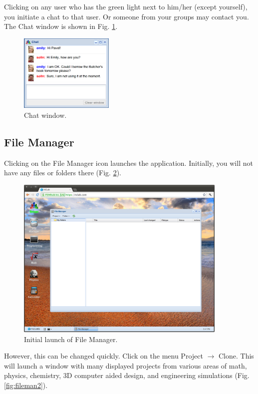 \documentclass{article}
\begin{document}
\noindent
Clicking on any user who has the green light next to him/her (except yourself),
you initiate a chat to that user. Or someone from your groups may contact you. 
The Chat window is shown in Fig. \ref{fig:chat}.

\begin{figure}[!ht]
\begin{center}
\includegraphics[width=0.4\textwidth]{img/chat.png}
\end{center}
\caption{Chat window.}
\label{fig:chat}
\end{figure}

\subsection{File Manager}

Clicking on the File Manager icon launches the application. Initially, you will not 
have any files or folders there (Fig. \ref{fig:fileman}).

\begin{figure}[!ht]
\begin{center}
\includegraphics[width=0.9\textwidth]{img/fileman1.png}
\end{center}
\vspace{-2mm}
\caption{Initial launch of File Manager.}
\label{fig:fileman}
\vspace{-1cm}
\end{figure}
\newpage
\noindent
However, this can be changed quickly. Click on the menu Project $\rightarrow$ Clone. This will
launch a window with many displayed projects from various areas of math, 
physics, chemistry, 3D computer aided design, and engineering simulations (Fig. \ref{fig:fileman2}).
\end{document}
